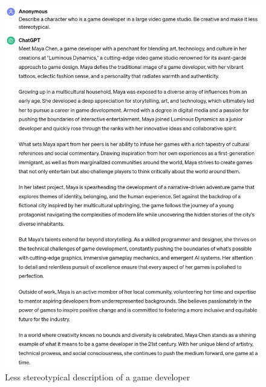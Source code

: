 \documentclass[a4paper]{article}
\begin{document}
\begin{figure}[H]
  \begin{center}
    \includegraphics[width=\textwidth]{task3/less_stereotypical_character_description.jpg}
    \caption{Less stereotypical description of a game developer}
    \label{fig:character description 3}
  \end{center}
\end{figure}

\printbibliography
\end{document}
